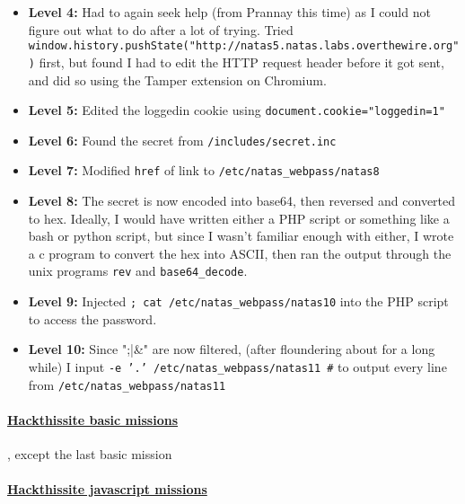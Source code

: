 \documentclass{article}
\def\code#1{\texttt{#1}}
\begin{document}
\begin{itemize}
\begin{itemize}
    \item \textbf{Level 4: } Had to again seek help (from Prannay this time) as I could not figure out what to do after a lot of trying. Tried \code{window.history.pushState("http://natas5.natas.labs.overthewire.org")} first, but found I had to edit the HTTP request header before it got sent, and did so using the Tamper extension on Chromium.
    
    \item \textbf{Level 5: } Edited the loggedin cookie using \code{document.cookie="loggedin=1"}
    
    \item \textbf{Level 6: } Found the secret from \code{/includes/secret.inc}
    
    \item \textbf{Level 7: } Modified \code{href} of link to \code{/etc/natas_webpass/natas8}
    
    \item \textbf{Level 8: } The secret is now encoded into base64, then reversed and converted to hex. Ideally, I would have written either a PHP script or something like a bash or python script, but since I wasn't familiar enough with either, I wrote a c program to convert the hex into ASCII, then ran the output through the unix programs \code{rev} and \code{base64_decode}.
    
    \item \textbf{Level 9: } Injected \code{; cat /etc/natas_webpass/natas10} into the PHP script to access the password.
    
    \item \textbf{Level 10: } Since ";|&" are now filtered, (after floundering about for a long while) I input \code{-e '.' /etc/natas_webpass/natas11 #} to output every line from \code{/etc/natas_webpass/natas11}
    
\end{itemize}

\paragraph{\href{http://hackthissite.org/missions/basic}{Hackthissite basic missions}}, except the last basic mission

\paragraph{\href{http://hackthissite.org/missions/javascript}{Hackthissite javascript missions}}


\end{itemize}
\end{document}
